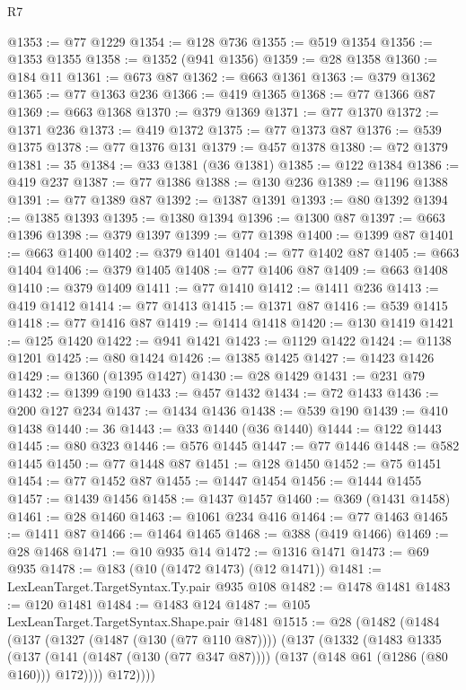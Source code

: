 \begin{lexlean}{R7}
\begin{coremodule}
@1353 := @77 @1229
@1354 := @128 @736
@1355 := @519 @1354
@1356 := @1353 @1355
@1358 := @1352 (@941 @1356)
@1359 := @28 @1358
@1360 := @184 @11
@1361 := @673 @87
@1362 := @663 @1361
@1363 := @379 @1362
@1365 := @77 @1363 @236
@1366 := @419 @1365
@1368 := @77 @1366 @87
@1369 := @663 @1368
@1370 := @379 @1369
@1371 := @77 @1370
@1372 := @1371 @236
@1373 := @419 @1372
@1375 := @77 @1373 @87
@1376 := @539 @1375
@1378 := @77 @1376 @131
@1379 := @457 @1378
@1380 := @72 @1379
@1381 := 35
@1384 := @33 @1381 (@36 @1381)
@1385 := @122 @1384
@1386 := @419 @237
@1387 := @77 @1386
@1388 := @130 @236
@1389 := @1196 @1388
@1391 := @77 @1389 @87
@1392 := @1387 @1391
@1393 := @80 @1392
@1394 := @1385 @1393
@1395 := @1380 @1394
@1396 := @1300 @87
@1397 := @663 @1396
@1398 := @379 @1397
@1399 := @77 @1398
@1400 := @1399 @87
@1401 := @663 @1400
@1402 := @379 @1401
@1404 := @77 @1402 @87
@1405 := @663 @1404
@1406 := @379 @1405
@1408 := @77 @1406 @87
@1409 := @663 @1408
@1410 := @379 @1409
@1411 := @77 @1410
@1412 := @1411 @236
@1413 := @419 @1412
@1414 := @77 @1413
@1415 := @1371 @87
@1416 := @539 @1415
@1418 := @77 @1416 @87
@1419 := @1414 @1418
@1420 := @130 @1419
@1421 := @125 @1420
@1422 := @941 @1421
@1423 := @1129 @1422
@1424 := @1138 @1201
@1425 := @80 @1424
@1426 := @1385 @1425
@1427 := @1423 @1426
@1429 := @1360 (@1395 @1427)
@1430 := @28 @1429
@1431 := @231 @79
@1432 := @1399 @190
@1433 := @457 @1432
@1434 := @72 @1433
@1436 := @200 @127 @234
@1437 := @1434 @1436
@1438 := @539 @190
@1439 := @410 @1438
@1440 := 36
@1443 := @33 @1440 (@36 @1440)
@1444 := @122 @1443
@1445 := @80 @323
@1446 := @576 @1445
@1447 := @77 @1446
@1448 := @582 @1445
@1450 := @77 @1448 @87
@1451 := @128 @1450
@1452 := @75 @1451
@1454 := @77 @1452 @87
@1455 := @1447 @1454
@1456 := @1444 @1455
@1457 := @1439 @1456
@1458 := @1437 @1457
@1460 := @369 (@1431 @1458)
@1461 := @28 @1460
@1463 := @1061 @234 @416
@1464 := @77 @1463
@1465 := @1411 @87
@1466 := @1464 @1465
@1468 := @388 (@419 @1466)
@1469 := @28 @1468
@1471 := @10 @935 @14
@1472 := @1316 @1471
@1473 := @69 @935
@1478 := @183 (@10 (@1472 @1473) (@12 @1471))
@1481 := LexLeanTarget.TargetSyntax.Ty.pair @935 @108
@1482 := @1478 @1481
@1483 := @120 @1481
@1484 := @1483 @124
@1487 := @105 LexLeanTarget.TargetSyntax.Shape.pair @1481
@1515 := @28
    (@1482
      (@1484
        (@137
          (@1327 (@1487 (@130 (@77 @110 @87))))
          (@137
            (@1332
              (@1483
                @1335
                (@137
                  (@141 (@1487 (@130 (@77 @347 @87))))
                  (@137 (@148 @61 (@1286 (@80 @160))) @172))))
            @172))))

\end{coremodule}
\end{lexlean}
